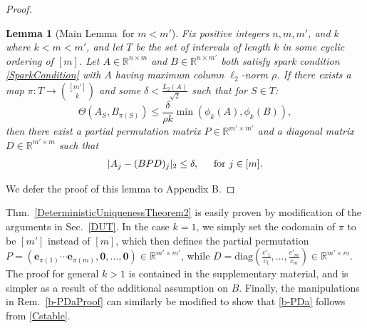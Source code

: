 \documentclass[journal, twocolumn]{IEEEtran}
\newtheorem{lemma}{Lemma}
\begin{document}
\begin{proof}
\begin{lemma}[Main Lemma~for $m < m'$]\label{MainLemma2}
Fix positive integers $n, m, m'$, and $k$ where $k < m < m'$, and let $T$ be the set of intervals of length $k$ in some cyclic ordering of $[m]$. Let $A \in \mathbb{R}^{n \times m}$ and $B \in \mathbb{R}^{n \times m'}$ both satisfy spark condition \eqref{SparkCondition} with $A$ having maximum column $\ell_2$-norm $\rho$. If there exists a map $\pi: T \to {[m'] \choose k}$ and some $\delta < \frac{L_{2}(A)}{\sqrt{2}}$ such that for $S \in T$:
\begin{equation}\label{GapUpperBound2}
\Theta(A_{S}, B_{\pi(S)}) \leq \frac{ \delta }{\rho k} \min(\phi_k(A), \phi_k(B)),
\end{equation}
then there exist a partial permutation matrix $P \in \mathbb{R}^{m' \times m'}$ and a diagonal matrix $D \in \mathbb{R}^{m' \times m}$ such that
\begin{align}
|A_j - (BPD)_j|_2 \leq \delta, \indent \text{for } j \in [m].
\end{align}
\end{lemma}

We defer the proof of this lemma to Appendix B.



\end{proof}

Thm.~\ref{DeterministicUniquenessTheorem2} is easily proven by modification of the arguments in Sec.~\ref{DUT}. In the case $k=1$, we simply set the codomain of $\pi$ to be $[m']$ instead of $[m]$, which then defines the partial permutation $P = \left( \mathbf{e}_{\pi(1)} \cdots \mathbf{e}_{\pi(m)}, \mathbf{0}, \ldots, \mathbf{0} \right) \in \mathbb{R}^{m' \times m'}$, while $D = \text{diag}(\frac{c'_1}{c_1},\ldots,\frac{c'_m}{c_m}) \in \mathbb{R}^{m' \times m}$. The proof for general $k>1$ is contained in the supplementary material, and is simpler as a result of the additional assumption on $B$. Finally, the manipulations in Rem.~\ref{b-PDaProof} can similarly be modified to show that \eqref{b-PDa} follows from \eqref{Cstable}. 
\end{document}
